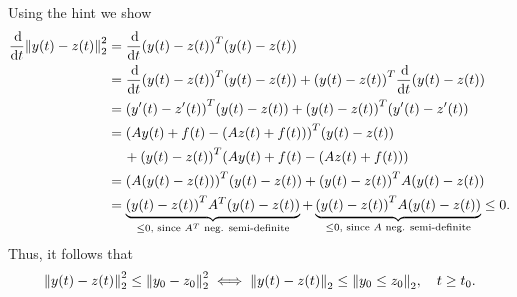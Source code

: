 \documentclass{exercise}
\begin{document}
	Using the hint we show
	\begin{align*}
		\frac{\d}{\d t}\norm*{y\parentheses*{t} - z\parentheses*{t}}_2^2 &= \frac{\d}{\d t}\parentheses*{y\parentheses*{t} - z\parentheses*{t}}^T \parentheses*{y\parentheses*{t} - z\parentheses*{t}}\\
		&= \frac{\d}{\d t}\parentheses*{y\parentheses*{t} - z\parentheses*{t}}^T\parentheses*{y\parentheses*{t} - z\parentheses*{t}} + \parentheses*{y\parentheses*{t} - z\parentheses*{t}}^T \frac{\d}{\d t}\parentheses*{y\parentheses*{t} - z\parentheses*{t}}\\
		&= \parentheses*{y'\parentheses*{t} - z'\parentheses*{t}}^T \parentheses*{y\parentheses*{t} - z\parentheses*{t}} + \parentheses*{y\parentheses*{t} - z\parentheses*{t}}^T \parentheses*{y'\parentheses*{t} - z'\parentheses*{t}}\\
		&= \parentheses*{Ay\parentheses*{t} + f\parentheses*{t} - \parentheses*{Az\parentheses*{t} + f\parentheses*{t}}}^T \parentheses*{y\parentheses*{t} - z\parentheses*{t}}\\
		&\quad\, + \parentheses*{y\parentheses*{t} - z\parentheses*{t}}^T \parentheses*{Ay\parentheses*{t} + f\parentheses*{t} - \parentheses*{Az\parentheses*{t} + f\parentheses*{t}}}\\
		&= \parentheses*{A\parentheses*{y\parentheses*{t} - z\parentheses*{t}}}^T \parentheses*{y\parentheses*{t} - z\parentheses*{t}} + \parentheses*{y\parentheses*{t} - z\parentheses*{t}}^T A\parentheses*{y\parentheses*{t} - z\parentheses*{t}}\\
		&= \underbrace{\parentheses*{y\parentheses*{t} - z\parentheses*{t}}^T A^T\parentheses*{y\parentheses*{t} - z\parentheses*{t}}}_{\le 0\text{, since }A^T\text{ neg. semi-definite}} + \underbrace{\parentheses*{y\parentheses*{t} - z\parentheses*{t}}^T A\parentheses*{y\parentheses*{t} - z\parentheses*{t}}}_{\le 0\text{, since }A\text{ neg. semi-definite}} \le 0.
	\end{align*}
	Thus, it follows that
	\[
		\norm*{y\parentheses*{t} - z\parentheses*{t}}_2^2 \le \norm*{y_0 - z_0}_2^2 \iff \norm*{y\parentheses*{t} - z\parentheses*{t}}_2 \le \norm*{y_0 \le z_0}_2, \quad t \ge t_0.
	\]
\end{document}
